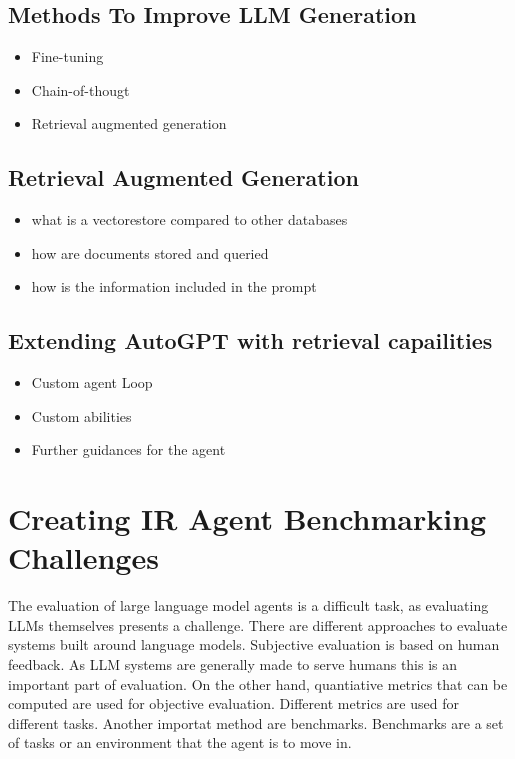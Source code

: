 \documentclass[english, version-2022-01]{uzl-thesis}
\begin{document}
\section{Methods To Improve LLM Generation}

\begin{itemize}
	\item Fine-tuning
	\item Chain-of-thougt
	\item Retrieval augmented generation
\end{itemize}

\section{Retrieval Augmented Generation}

\begin{itemize}
	\item what is a vectorestore compared to other databases
	\item how are documents stored and queried
	\item how is the information included in the prompt
\end{itemize}


\section{Extending AutoGPT with retrieval capailities}

\begin{itemize}
	\item Custom agent Loop
	\item Custom abilities
	\item Further guidances for the agent
\end{itemize}

\chapter{Creating IR Agent Benchmarking Challenges}

The evaluation of large language model agents is a difficult task, as evaluating LLMs themselves presents a challenge. There are different approaches to evaluate systems built around language models. Subjective evaluation is based on human feedback. As LLM systems are generally made to serve humans this is an important part of evaluation. On the other hand, quantiative metrics that can be computed are used for objective evaluation. Different metrics are used for different tasks. Another importat method are benchmarks. Benchmarks are a set of tasks or an environment that the agent is to move in.
\end{document}
